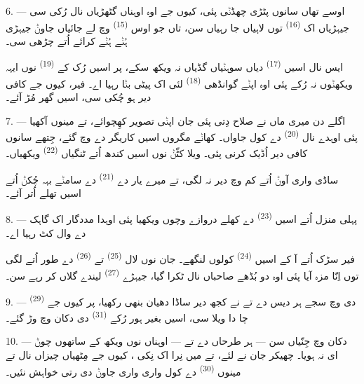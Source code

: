 6. --- اوسے تھاں سانوں پٹڑی چھڈݨی پئی، کیوں جے اوہ اوہناں گٹھڑیاں نال رُکی سی
جیہڑیاں اک  \textsuperscript{(16)} توں لاہیاں جا رہیاں
سن، تاں جو اوس  \textsuperscript{(15)} وچ لے جائیاں جاوݨ جیہڑی ہُݨے
ہُݨے کرائے اُتے چڑھی سی۔

ایس نال اسیں  \textsuperscript{(17)} دیاں سوہݨیاں گڈیاں نہ
ویکھ سکے، پر اسیں رُک کے  \textsuperscript{(19)} نوں ایہہ ویکھݨوں
نہ رُکے پئی اوہ اپݨے گوانڈھی  \textsuperscript{(18)}
لئی اک پیٹی بݨا رہیا اے۔ فیر، کیوں جے کافی دیر ہو چُکی سی، اسیں گھر مُڑ آئے۔

\VUsaut{3.0mm}

7. --- اگلے دن میری ماں نے صلاح دِتی پئی جان اپݨی تصویر کھِچوائے، تے مینوں آکھیا
پئی اوہدے نال  \textsuperscript{(20)} دے کول جاواں۔ کھاݨے مگروں
اسیں کاریگر دے  وچ گئے، جِتھے سانوں کافی دیر اُڈیک کرنی پئی۔ ویلا
کٹّݨ نوں اسیں کندھ اُتے ٹنگیاں  \textsuperscript{(22)} ویکھیاں۔

ساڈی واری آوݨ اُتے کم وچ دیر نہ لگی، تے میرے یار دے 
\textsuperscript{(21)} دے سامݨے بہہ چُکݨ اُتے اسیں تھلے اُتر آئے۔

8. --- پہلی منزل اُتے اسیں  \textsuperscript{(23)} دے کھلے دروازے وچوں
ویکھیا پئی اوہدا مددگار اک گاہک دے وال کٹ رہیا اے۔

فیر سڑک اُتے آ کے اسیں  \textsuperscript{(24)} کولوں لنگھے۔
جان نوں لال  \textsuperscript{(25)} تے 
\textsuperscript{(26)} دے طور اُتے لگی  توں اِنّا مزہ آیا پئی اوہ دو
بُڈھے صاحباں نال ٹکرا گیا، جیہڑے  \textsuperscript{(27)}
لیندے گلاں کر رہے سن۔

\VUsaut{3.0mm}

9. ---  \textsuperscript{(29)} دی  وچ سجے ہر دیس دے
 تے  نے کجھ دیر ساڈا دھیان بنھی رکھیا، پر کیوں جے چا دا
ویلا سی، اسیں بغیر ہور رُکے  \textsuperscript{(31)} دی دکان وچ وڑ گئے۔

10. --- دکان وچ جِنّیاں  سن — ہر طرحاں دے  تے  — اوہناں نوں ویکھ کے ساتھوں چوݨ ای نہ ہویا۔
چھیکر جان نے  لئے، تے میں نِرا اک نِکی ،
کیوں جے مِٹھیاں چیزاں نال  تے مینوں  \textsuperscript{(30)} دے کول واری واری جاوݨ دی رتی خواہش نئیں۔

